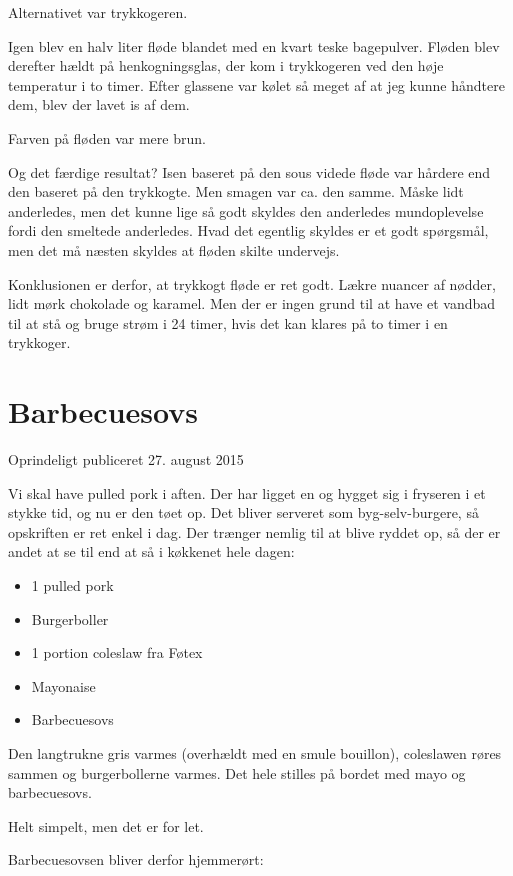 \documentclass[
]{book}
\providecommand{\tightlist}{%
  \setlength{\itemsep}{0pt}\setlength{\parskip}{0pt}}
\begin{document}
Alternativet var trykkogeren.

Igen blev en halv liter fløde blandet med en kvart teske bagepulver. Fløden blev derefter hældt på henkogningsglas, der kom i trykkogeren ved den høje temperatur i to timer. Efter glassene var kølet så meget af at jeg kunne håndtere dem, blev der lavet is af dem.

Farven på fløden var mere brun.

Og det færdige resultat? Isen baseret på den sous videde fløde var hårdere end den baseret på den trykkogte. Men smagen var ca. den samme. Måske lidt anderledes, men det kunne lige så godt skyldes den anderledes mundoplevelse fordi den smeltede anderledes. Hvad det egentlig skyldes er et godt spørgsmål, men det må næsten skyldes at fløden skilte undervejs.

Konklusionen er derfor, at trykkogt fløde er ret godt. Lækre nuancer af nødder, lidt mørk chokolade og karamel. Men der er ingen grund til at have et vandbad til at stå og bruge strøm i 24 timer, hvis det kan klares på to timer i en trykkoger.

\hypertarget{barbecuesovs}{%
\section{Barbecuesovs}\label{barbecuesovs}}

Oprindeligt publiceret 27. august 2015

Vi skal have pulled pork i aften. Der har ligget en og hygget sig i fryseren i et stykke tid, og nu er den tøet op. Det bliver serveret som byg-selv-burgere, så opskriften er ret enkel i dag. Der trænger nemlig til at blive ryddet op, så der er andet at se til end at så i køkkenet hele dagen:

\begin{itemize}
\tightlist
\item
  1 pulled pork
\item
  Burgerboller
\item
  1 portion coleslaw fra Føtex
\item
  Mayonaise
\item
  Barbecuesovs
\end{itemize}

Den langtrukne gris varmes (overhældt med en smule bouillon), coleslawen røres sammen og burgerbollerne varmes. Det hele stilles på bordet med mayo og barbecuesovs.~

Helt simpelt, men det er for let.

Barbecuesovsen bliver derfor hjemmerørt:
\end{document}
